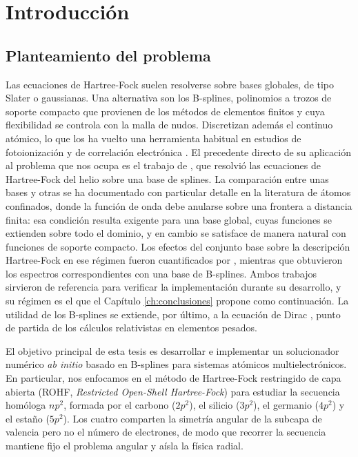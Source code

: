\chapter{Introducción}
\label{ch:introduccion}

\section{Planteamiento del problema}
\label{sec:planteamiento}

Las ecuaciones de Hartree-Fock suelen resolverse sobre bases globales, de tipo Slater o gaussianas. Una alternativa son los B-splines, polinomios a trozos de soporte compacto que provienen de los métodos de elementos finitos y cuya flexibilidad se controla con la malla de nudos. Discretizan además el continuo atómico, lo que los ha vuelto una herramienta habitual en estudios de fotoionización \parencite{Bachau2001} y de correlación electrónica \parencite{Johnson2007}. El precedente directo de su aplicación al problema que nos ocupa es el trabajo de \textcite{Fischer1990}, que resolvió las ecuaciones de Hartree-Fock del helio sobre una base de splines. La comparación entre unas bases y otras se ha documentado con particular detalle en la literatura de átomos confinados, donde la función de onda debe anularse sobre una frontera a distancia finita: esa condición resulta exigente para una base global, cuyas funciones se extienden sobre todo el dominio, y en cambio se satisface de manera natural con funciones de soporte compacto. Los efectos del conjunto base sobre la descripción Hartree-Fock en ese régimen fueron cuantificados por \textcite{Garza2012}, mientras que \textcite{TingYun2001} obtuvieron los espectros correspondientes con una base de B-splines. Ambos trabajos sirvieron de referencia para verificar la implementación durante su desarrollo, y su régimen es el que el Capítulo \ref{ch:conclusiones} propone como continuación. La utilidad de los B-splines se extiende, por último, a la ecuación de Dirac \parencite{Johnson1988}, punto de partida de los cálculos relativistas en elementos pesados.

El objetivo principal de esta tesis es desarrollar e implementar un solucionador numérico \textit{ab initio} basado en B-splines para sistemas atómicos multielectrónicos. En particular, nos enfocamos en el método de Hartree-Fock restringido de capa abierta (ROHF, \textit{Restricted Open-Shell Hartree-Fock}) para estudiar la secuencia homóloga $np^2$, formada por el carbono ($2p^2$), el silicio ($3p^2$), el germanio ($4p^2$) y el estaño ($5p^2$). Los cuatro comparten la simetría angular de la subcapa de valencia pero no el número de electrones, de modo que recorrer la secuencia mantiene fijo el problema angular y aísla la física radial.

